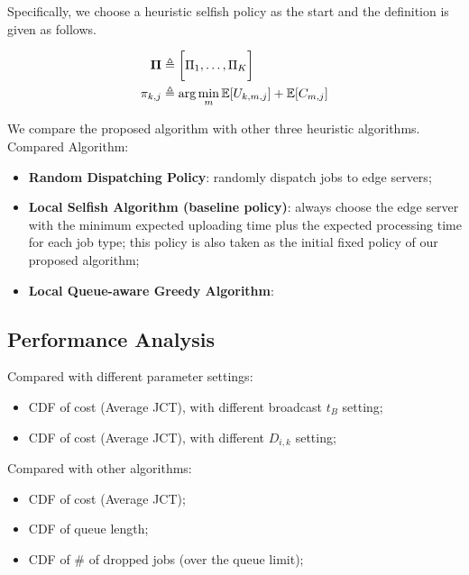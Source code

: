 Specifically, we choose a heuristic selfish policy as the start and the definition is given as follows.
\begin{definition}
    \begin{align}
        \boldsymbol{\Pi} &\triangleq \bigg[ \Pi_{1}, \dots, \Pi_{K} \bigg]
        \\
        \pi_{k,j} &\triangleq \arg\min_{m} \mathbb{E}[U_{k,m,j}] + \mathbb{E}[C_{m,j}]
    \end{align}
\end{definition}

We compare the proposed algorithm with other three heuristic algorithms.
Compared Algorithm:
\begin{itemize}
    \item \textbf{Random Dispatching Policy}:
            randomly dispatch jobs to edge servers;
    \item \textbf{Local Selfish Algorithm (baseline policy)}:
            always choose the edge server with the minimum expected uploading time plus the expected processing time for each job type; this policy is also taken as the initial fixed policy of our proposed algorithm;
    \item \textbf{Local Queue-aware Greedy Algorithm}:
\end{itemize}


\subsection{Performance Analysis}
Compared with different parameter settings:
\begin{itemize}
    \item CDF of cost (Average JCT), with different broadcast $t_B$ setting;
    \item CDF of cost (Average JCT), with different \brlatency $D_{i,k}$ setting;
\end{itemize}

Compared with other algorithms:
\begin{itemize}
    \item CDF of cost (Average JCT);
    \item CDF of queue length;
    \item CDF of \# of dropped jobs (over the queue limit);
\end{itemize}